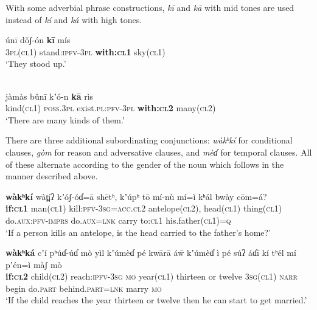 \documentclass[output=collectionpaper,hidelinks]{langscibook}
\theoremstyle{remark}
\begin{document}
With some adverbial phrase constructions, \emph{kī} and \emph{kā} with mid tones are used instead of \emph{kí} and \emph{ká} with high tones.\nocite{d:BeamCridland:Uduk}

\ea
\gll  únī dǒʃ-ón \textbf{kī} mís \\
 \textsc{3pl}(\textsc{cl1}) stand:\textsc{ipfv}-\textsc{3pl} \textbf{with:\textsc{cl1}} sky(\textsc{cl1}) \\
\glt `They stood up.' \\
\z

\ea
\citep{d:BeamCridland:Uduk}\\
\gll  jàmàs bǔnī kʼó-n \textbf{kā} rìs \\
 kind(\textsc{cl1}) \textsc{poss.3pl} exist.\textsc{pl}:\textsc{pfv}-\textsc{3pl} \textbf{with:\textsc{cl2}} many(\textsc{cl2}) \\
\glt `There are many kinds of them.' \\
\z

There are three additional subordinating conjunctions: \emph{wàkʰkí} for
conditional clauses, \emph{gòm} for reason and adversative clauses, and
\emph{mèɗ} for temporal clauses. All of these alternate according to the
gender of the noun which follows in the manner described above.

\ea
\gll  \textbf{wàkʰkí} wàt̪íʔ kʼóʃ-óɗ=ā shētʰ, kʼúpʰ tō mí-nù mí=ì kʰál bwày cōm=á? \\
 \textbf{if:\textsc{cl1}} man(\textsc{cl1}) kill:\textsc{pfv}-\textsc{3sg}=\textsc{acc.cl2} antelope(\textsc{cl2}), head(\textsc{cl1}) thing(\textsc{cl1}) do.\textsc{aux}:\textsc{pfv}-\textsc{imprs} do.\textsc{aux}=\textsc{lnk} carry to:\textsc{cl1} his.father(\textsc{cl1})=\textsc{q} \\
\glt `If a person kills an antelope, is the head carried to the father's home?' \\
\z

\ea
\label{ex:Don:reach-year}
\gll \textbf{wàkʰká} cʼí pʰúɗ-úɗ mò yìl {kʼúmèɗ pé kwārā} áw̄ {kʼúmèɗ ì pé súʔ} áɗī kí tʰél mí pʼén=ì màʃ mò\\
 \textbf{if:\textsc{cl2}} child(\textsc{cl2}) reach:\textsc{ipfv}-\textsc{3sg} \textsc{mo} year(\textsc{cl1}) thirteen or twelve \textsc{3sg}(\textsc{cl1}) \textsc{narr} begin do.\textsc{part} behind.\textsc{part}=\textsc{lnk} marry \textsc{mo}\\
\glt `If the child reaches the year thirteen or twelve then he can start to get married.' \\
\z
\end{document}
